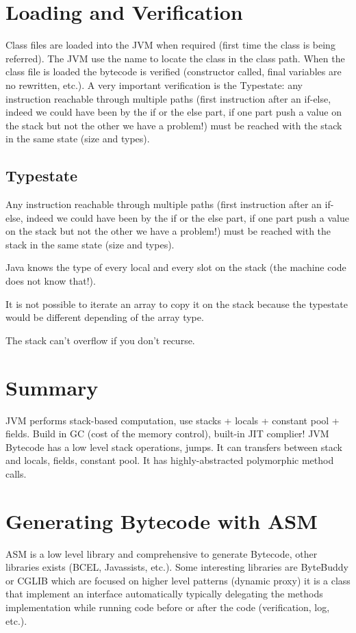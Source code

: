 \section{Loading and Verification}
Class files are loaded into the JVM when required (first time the class is being
referred). The JVM use the name to locate the class in the class path. When the
class file is loaded the bytecode is verified (constructor called, final
variables are no rewritten, etc.). A very important verification is the
Typestate: any instruction reachable through multiple paths (first instruction
after an if-else, indeed we could have been by the if or the else part, if one
part push a value on the stack but not the other we have a problem!) must be
reached with the stack in the same state (size and types).
\subsection{Typestate}
    \theoremstyle{definition}
    \begin{definition}[name]
        Any instruction reachable through multiple paths (first instruction
after an if-else, indeed we could have been by the if or the else part, if one
part push a value on the stack but not the other we have a problem!) must be
reached with the stack in the same state (size and types).
    \end{definition}

    Java knows the type of every local and every slot on the stack (the machine
    code does not know that!). 

    It is not possible to iterate an array to copy it on the stack because the
    typestate would be different depending of the array type.

    The stack can't overflow if you don't recurse.

\section{Summary}
    JVM performs stack-based computation, use stacks + locals + constant pool +
    fields. Build in GC (cost of the memory control), built-in JIT complier! JVM
    Bytecode has a low level stack operations, jumps. It can transfers between
    stack and locals, fields, constant pool. It has highly-abstracted
    polymorphic method calls.

\section{Generating Bytecode with ASM}
ASM is a low level library and comprehensive to generate Bytecode, other
libraries exists (BCEL, Javassists, etc.). Some interesting libraries are
ByteBuddy or CGLIB which are focused on higher level patterns (dynamic proxy) it
is a class that implement an interface automatically typically delegating the
methods implementation while running code before or after the code
(verification, log, etc.).

